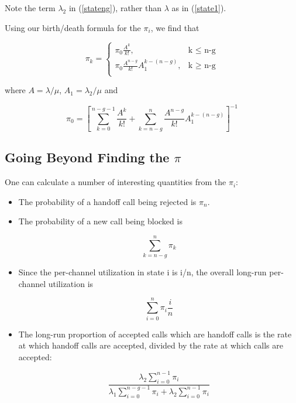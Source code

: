 Note the term $\lambda_2$ in (\ref{stateng}), rather than $\lambda$ as
in (\ref{state1}). 

Using our birth/death formula for the $\pi_i$, we find that

\begin{equation}
\pi_k = \begin{cases}
   \pi_0 \frac{A^k}{k!}, & \text{k $\leq$ n-g} \\
   \pi_0 \frac{A^{n-g}}{k!} A_1^{k-(n-g)}, & \text{k $\geq$ n-g} \\
\end{cases}
\end{equation}

where $A = \lambda/\mu$, $A_1 = \lambda_2/\mu$ and

\begin{equation}
\pi_0 = \left [
\sum_{k=0}^{n-g-1} \frac{A^k}{k!} + 
\sum_{k=n-g}^n \frac{A^{n-g}}{k!} A_1^{k-(n-g)}
\right ] ^ {-1}
\end{equation}

\subsection{Going Beyond Finding the $\pi$}

One can calculate a number of interesting quantities from the $\pi_i$:

\begin{itemize}

\item The probability of a handoff call being rejected is $\pi_n$.  

\item The probability of a new call being blocked is

\begin{equation}
\sum_{k=n-g}^{n} \pi_k
\end{equation}

\item Since the per-channel utilization in state i is i/n, the overall
long-run per-channel utilization is

\begin{equation}
\sum_{i=0}^n \pi_i \frac{i}{n} 
\end{equation}

\item The long-run proportion of accepted calls which are handoff calls
is the rate at which handoff calls are accepted, divided by the rate at
which calls are accepted:

\begin{equation}
\frac{\lambda_2 \sum_{i=0}^{n-1} \pi_i} 
{\lambda_1 \sum_{i=0}^{n-g-1} \pi_i + \lambda_2 \sum_{i=0}^{n-1} \pi_i}
\end{equation}


\end{itemize}


